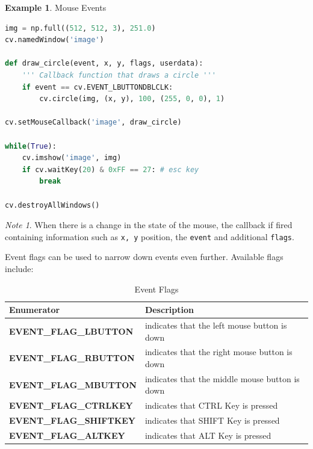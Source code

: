 \documentclass{article}
\theoremstyle{definition}
\newtheorem{ex}{Example}[subsection]
\theoremstyle{remark}
\newtheorem*{nb}{Note}
\begin{document}
\break

\begin{ex} Mouse Events
\begin{lstlisting}[language=Python]
img = np.full((512, 512, 3), 251.0)
cv.namedWindow('image')

def draw_circle(event, x, y, flags, userdata):
    ''' Callback function that draws a circle '''
    if event == cv.EVENT_LBUTTONDBLCLK:
        cv.circle(img, (x, y), 100, (255, 0, 0), 1)

cv.setMouseCallback('image', draw_circle)

while(True):
    cv.imshow('image', img)
    if cv.waitKey(20) & 0xFF == 27: # esc key
        break

cv.destroyAllWindows()
\end{lstlisting}
\begin{nb}
When there is a change in the state of the mouse, the callback if fired containing information such as \lstinline{x, y} position, the \lstinline{event} and additional \lstinline{flags}.\\
\end{nb}
\end{ex}

\noindent Event flags can be used to narrow down events even further. Available flags include: \\

\begin{table}[h!]
    \centering
    \def\arraystretch{1.1}%
    \begin{tabular}{ p{5cm} p{7cm} } 
	\hline
	Enumerator & Description \\
	\hline
	\textbf{\footnotesize{EVENT\_FLAG\_LBUTTON}} & indicates that the left mouse button is down \\

	\textbf{\footnotesize{EVENT\_FLAG\_RBUTTON}} & indicates that the right mouse button is down \\

	\textbf{\footnotesize{EVENT\_FLAG\_MBUTTON}} & indicates that the middle mouse button is down \\

	\textbf{\footnotesize{EVENT\_FLAG\_CTRLKEY}} & indicates that CTRL Key is pressed \\

	\textbf{\footnotesize{EVENT\_FLAG\_SHIFTKEY}} & indicates that SHIFT Key is pressed \\

	\textbf{\footnotesize{EVENT\_FLAG\_ALTKEY}} & indicates that ALT Key is pressed \\
	\hline
    \end{tabular}
    \caption{Event Flags}
    \label{table:event_flags}
\end{table}
\end{document}
